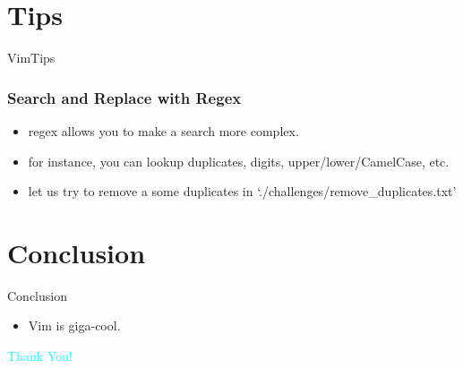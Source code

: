 \documentclass{beamer}
\begin{document}
\section{Tips}
\begin{frame}{VimTips}
    \frametitle{Search and Replace with Regex}
    \begin{itemize}
        \item regex allows you to make a search more complex.
        \item for instance, you can lookup duplicates, digits, upper/lower/CamelCase, etc.
        \item let us try to remove a some duplicates in `./challenges/remove\_duplicates.txt'
    \end{itemize}
\end{frame}

\section{Conclusion}
\begin{frame}{Conclusion}
    \begin{itemize}
        \item Vim is giga-cool.
    \end{itemize}
\end{frame}

\begin{frame}
    \centering
    {\Huge \textcolor{cyan}{Thank You!}}
\end{frame}
\end{document}
